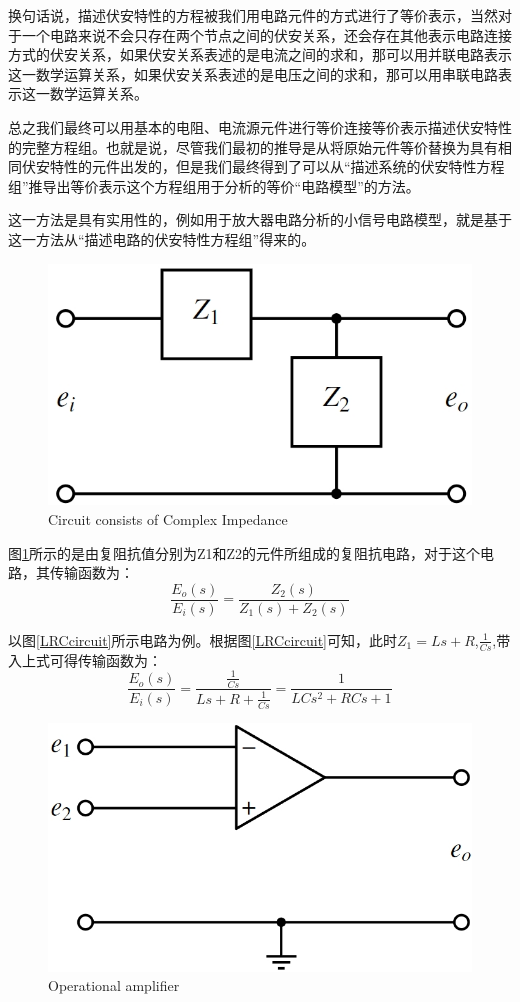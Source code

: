 \documentclass{article}
\numberwithin{equation}{section}
\numberwithin{figure}{section}
\begin{document}
换句话说，描述伏安特性的方程被我们用电路元件的方式进行了等价表示，当然对于一个电路来说不会只存在两个节点之间的伏安关系，还会存在其他表示电路连接方式的伏安关系，如果伏安关系表述的是电流之间的求和，那可以用并联电路表示这一数学运算关系，如果伏安关系表述的是电压之间的求和，那可以用串联电路表示这一数学运算关系。

总之我们最终可以用基本的电阻、电流源元件进行等价连接等价表示描述伏安特性的完整方程组。也就是说，尽管我们最初的推导是从将原始元件等价替换为具有相同伏安特性的元件出发的，但是我们最终得到了可以从“描述系统的伏安特性方程组”推导出等价表示这个方程组用于分析的等价“电路模型”的方法。

这一方法是具有实用性的，例如用于放大器电路分析的小信号电路模型，就是基于这一方法从“描述电路的伏安特性方程组”得来的。

\begin{figure}
    \centering
    \includegraphics[width=.3\textwidth]{Chapter3/ComplexImpedencecircuit.png} %
    \caption{Circuit consists of Complex Impedance} %
    \label{ComplexImpedancecircuit} %
\end{figure}

图\ref{ComplexImpedancecircuit}所示的是由复阻抗值分别为Z1和Z2的元件所组成的复阻抗电路，对于这个电路，其传输函数为：
\begin{equation}
    \frac{E_o(s)}{E_i(s)}=\frac{Z_2(s)}{Z_1(s)+Z_2(s)}
\end{equation}

以图\ref{LRCcircuit}所示电路为例。根据图\ref{LRCcircuit}可知，此时$Z_1=Ls+R$,$\frac{1}{Cs}$,带入上式可得传输函数为：
\begin{equation}
    \frac{E_o(s)}{E_i(s)}=\frac{\frac{1}{Cs}}{Ls+R+\frac{1}{Cs}}=\frac{1}{LCs^2+RCs+1}
\end{equation}

\begin{figure}
    \centering
    \includegraphics[width=.4\textwidth]{Chapter3/Opa.png} %
    \caption{Operational amplifier} %
    \label{Operational amplifier} %
\end{figure}
\end{document}
